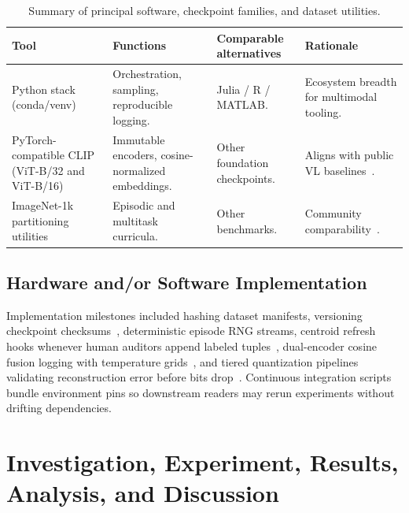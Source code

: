 \documentclass[12pt,a4paper]{report}
\begin{document}
\begin{table}[htbp]
  \centering
  \caption{Summary of principal software, checkpoint families, and dataset utilities.}
  \label{tab:tools}
  \begin{tabular}{p{3.6cm}p{4.2cm}p{3.2cm}p{3.2cm}}
    \toprule
    Tool & Functions & Comparable alternatives & Rationale \\
    \midrule
    Python stack (conda/venv) & Orchestration, sampling, reproducible logging. & Julia / R / MATLAB. & Ecosystem breadth for multimodal tooling. \\
    PyTorch-compatible CLIP (ViT-B/32 and ViT-B/16) & Immutable encoders, cosine-normalized embeddings. & Other foundation checkpoints. & Aligns with public VL baselines~\cite{r1}. \\
    ImageNet-1k partitioning utilities & Episodic and multitask curricula. & Other benchmarks. & Community comparability~\cite{r2}. \\
    \bottomrule
  \end{tabular}
\end{table}

\section{Hardware and/or Software Implementation}
Implementation milestones included hashing dataset manifests, versioning checkpoint checksums~\cite{r1}, deterministic episode RNG streams, centroid refresh hooks whenever human auditors append labeled tuples~\cite{r24}, dual-encoder cosine fusion logging with temperature grids~\cite{r5}, and tiered quantization pipelines validating reconstruction error before bits drop~\cite{r31,r32}. Continuous integration scripts bundle environment pins so downstream readers may rerun experiments without drifting dependencies.

\chapter{Investigation, Experiment, Results, Analysis, and Discussion}
\label{ch:res}
\end{document}

